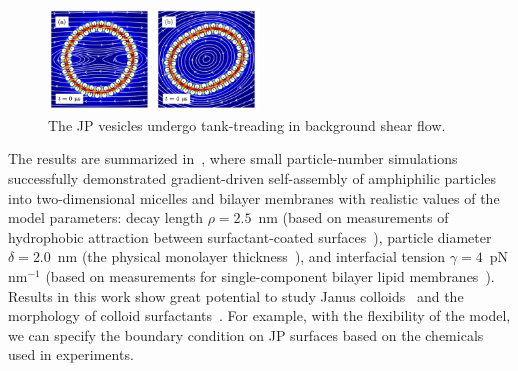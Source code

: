 \begin{figure}
\includegraphics[width=0.5\textwidth]{figures/PreliminaryWork/TankTreading.jpg}
\caption{\label{fig:JPv_linearshear}The JP vesicles undergo tank-treading in background shear flow.}
\end{figure}
The results are summarized in~\cite{Fu2018_SIAM}, where small
particle-number simulations successfully demonstrated gradient-driven
self-assembly of amphiphilic particles into two-dimensional micelles and
bilayer membranes with realistic values of the model parameters: decay
length $\rho=2.5$~nm (based on measurements of hydrophobic attraction
between surfactant-coated surfaces~\cite{Eriksson1989, Lin2005,
Parsegian, Israelachvili80}), particle diameter $\delta = 2.0$~nm (the
physical monolayer thickness~\cite{Boal}), and interfacial tension
$\gamma = 4$~pN nm$^{-1}$ (based on measurements for single-component
bilayer lipid membranes~\cite{GarciaSaez, KUZMIN2005, Petelska2012,
Jackson2016}).
%
%
Results in this work show great potential to study Janus
colloids~\cite{Bradley2017,Mallory2017} and the morphology of colloid
surfactants~\cite{Bradley2016}.  For example, with the flexibility of
the model, we can specify the boundary condition on JP surfaces based on
the chemicals used in experiments.

